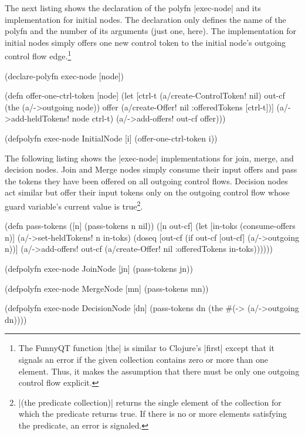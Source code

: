 \documentclass[submission]{eptcs}
\newcommand{\code}{\clojureinline}
\begin{document}
The next listing shows the declaration of the polyfn \code|exec-node| and its
implementation for initial nodes.  The declaration only defines the name of the
polyfn and the number of its arguments (just one, here).  The implementation
for initial nodes simply offers one new control token to the initial node's
outgoing control flow edge.\footnote{The FunnyQT function \code|the| is similar
  to Clojure's \code|first| except that it signals an error if the given
  collection contains zero or more than one element.  Thus, it makes the
  assumption that there must be only one outgoing control flow explicit.}

\begin{clojurecode}
(declare-polyfn exec-node [node])

(defn offer-one-ctrl-token [node]
  (let [ctrl-t (a/create-ControlToken! nil)
        out-cf (the (a/->outgoing node))
        offer  (a/create-Offer! nil {:offeredTokens [ctrl-t]})]
    (a/->add-heldTokens! node ctrl-t)
    (a/->add-offers! out-cf offer)))

(defpolyfn exec-node InitialNode [i]
  (offer-one-ctrl-token i))
\end{clojurecode}

The following listing shows the \code|exec-node| implementations for join,
merge, and decision nodes.  Join and Merge nodes simply consume their input
offers and pass the tokens they have been offered on all outgoing control
flows.  Decision nodes act similar but offer their input tokens only on the
outgoing control flow whose guard variable's current value is
true\footnote{\code|(the predicate collection)| returns the single element of
  the collection for which the predicate returns true.  If there is no or more
  elements satisfying the predicate, an error is signaled.}.

\begin{clojurecode}
(defn pass-tokens
  ([n] (pass-tokens n nil))
  ([n out-cf]
   (let [in-toks (consume-offers n)]
     (a/->set-heldTokens! n in-toks)
     (doseq [out-cf (if out-cf [out-cf] (a/->outgoing n))]
       (a/->add-offers!
        out-cf (a/create-Offer!
                nil {:offeredTokens in-toks}))))))

(defpolyfn exec-node JoinNode [jn]
  (pass-tokens jn))

(defpolyfn exec-node MergeNode [mn]
  (pass-tokens mn))

(defpolyfn exec-node DecisionNode [dn]
  (pass-tokens dn (the #(-> %
                       (a/->outgoing dn))))
\end{clojurecode}
\end{document}
